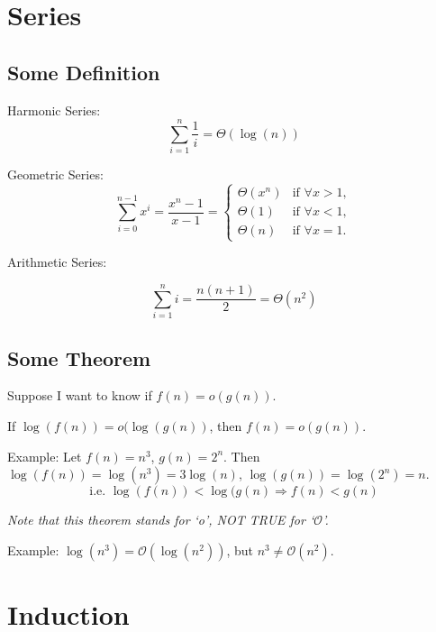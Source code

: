 
\section{Series}
\subsection{Some Definition}

\begin{definition}
Harmonic Series:
\[\sum_{i=1}^n {\frac{1}{i}} = \Theta(\log(n))\]
\end{definition}

\begin{definition}
Geometric Series:
\[
\sum_{i=0}^{n-1}{x^i} = \frac{x^n - 1}{x-1} =
\begin{cases}
\Theta(x^n) & \text{if } \forall x>1, \\
\Theta(1) & \text{if } \forall x<1, \\
\Theta(n) & \text{if } \forall x=1.
\end{cases}
\]
\end{definition}

\begin{definition}

Arithmetic Series:

\[\sum_{i=1}^n {i} = \frac{n(n+1)}{2} = \Theta(n^2)\]

\end{definition}

\subsection{Some Theorem}

Suppose I want to know if $f(n) = o(g(n))$.

\begin{theorem}
If $\log(f(n)) = o(\log(g(n))$, then $f(n) = o(g(n))$.
\end{theorem}

Example: Let $f(n) = n^3$, $g(n) = 2^n$. Then $\log(f(n)) = \log(n^3) = 3\log(n)$, $\log(g(n)) = \log(2^n) = n$.
\[\text{i.e. } \log(f(n)) < \log(g(n) \Rightarrow f(n) < g(n)\]

\emph{Note that this theorem stands for `o', NOT TRUE for `$\mathcal{O}$'.}

Example: $\log(n^3) = \mathcal{O}(\log(n^2))$, but $n^3 \neq \mathcal{O}(n^2)$.

\section{Induction}

